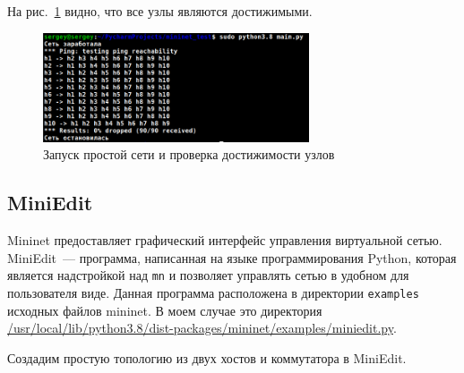 На рис.~\ref{fig:00001} видно, что все узлы являются достижимыми.

\begin{figure}[!h]
\centering
\includegraphics[width=0.7\textwidth]{image/net_start.png}
\caption{Запуск простой сети и проверка достижимости узлов}
\label{fig:00001}
\end{figure}

\subsection{MiniEdit}

Mininet предоставляет графический интерфейс управления виртуальной
сетью. MiniEdit~--- программа, написанная на языке
программирования Python, которая является надстройкой над \verb|mn| и
позволяет управлять сетью в удобном для пользователя виде. Данная
программа расположена в директории \verb|examples| исходных файлов mininet. В
моем случае это директория
\url{/usr/local/lib/python3.8/dist-packages/mininet/examples/miniedit.py}.

Создадим простую топологию из двух хостов и коммутатора в MiniEdit.

